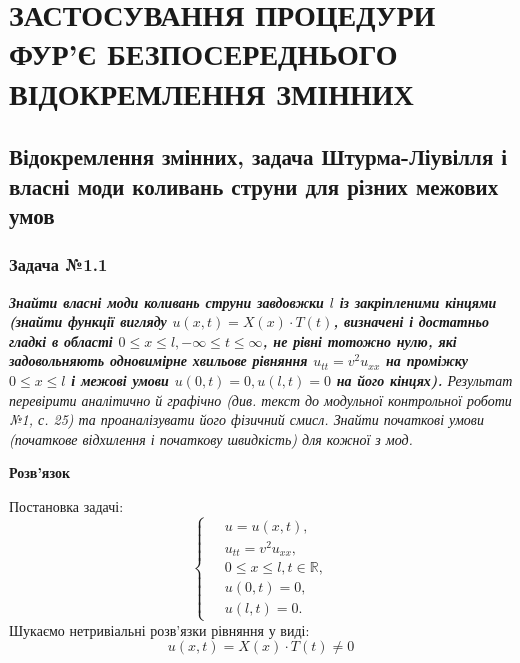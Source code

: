 \documentclass[a4paper, 14pt]{extreport}
\begin{document}
\tableofcontents
\setcounter{page}{2}

\chapter{ЗАСТОСУВАННЯ ПРОЦЕДУРИ ФУР’Є БЕЗПОСЕРЕДНЬОГО ВІДОКРЕМЛЕННЯ ЗМІННИХ}

\section{Відокремлення змінних, задача Штурма-Ліувілля і власні моди коливань струни для різних межових умов}

\subsection*{Задача №1.1}

\textit{\textbf{Знайти власні моди коливань струни завдовжки $l$ із закріпленими кінцями (знайти функції вигляду $u(x,t) = X(x) \cdot T(t)$, визначені і достатньо гладкі в області $0 \leq x \leq l, -\infty \leq t \leq \infty$, не рівні тотожно нулю, які задовольняють одновимірне хвильове рівняння $u_{tt} = v^2 u_{xx}$ на проміжку $0 \leq x \leq l$ і межові умови $u(0,t) = 0, u(l,t) = 0$ на його кінцях).} Результат перевірити аналітично й графічно (див. текст до модульної контрольної роботи №1, с. 25) та проаналізувати його фізичний смисл. Знайти початкові умови (початкове відхилення і початкову швидкість) для кожної з мод.}

\begin{center}
    \large{\textbf{Розв'язок}}
\end{center}

\noindent Постановка задачі:
\begin{equation}
    \left\{ \begin{aligned} %
        \;&u = u(x,t), \\  &u_{tt} = v^2 u_{xx}, \\ &0 \leq x \leq l, t \in \mathbb{R}, \\  &u(0,t) = 0, \\ &u(l,t) = 0. 
    \end{aligned} \right.
\end{equation}
Шукаємо нетривіальні розв'язки рівняння у виді:
\begin{equation} \label{subst}
    u(x,t) = X(x) \cdot T(t) \neq 0 
\end{equation}
\end{document}
